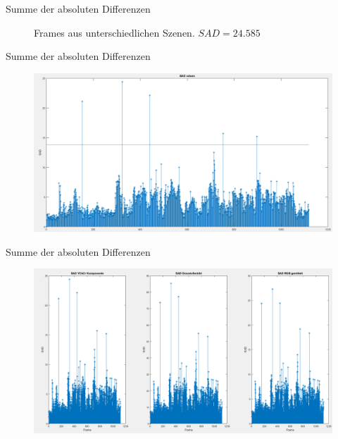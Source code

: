 \documentclass[11pt]{beamer}
\begin{document}
\begin{frame}{Summe der absoluten Differenzen}
\begin{figure}
\caption{Frames aus unterschiedlichen Szenen. $SAD = 24.585$} 
\end{figure} 
\end{frame}

\begin{frame}{Summe der absoluten Differenzen}
\begin{figure}
    \includegraphics[scale=0.3]{sadstem.png} 
\end{figure} 
\end{frame}

\begin{frame}{Summe der absoluten Differenzen}
\begin{figure}
    \includegraphics[scale=0.3]{sadstem3.png} 
\end{figure} 
\end{frame}
\end{document}
